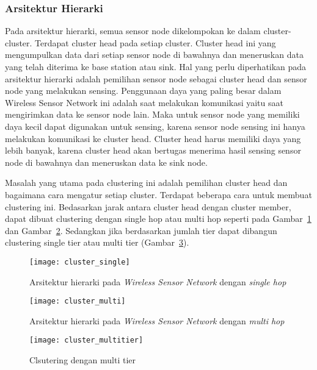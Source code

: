 \subsubsection{Arsitektur Hierarki}
Pada arsitektur hierarki, semua sensor node dikelompokan ke dalam cluster-cluster. Terdapat cluster head pada setiap cluster. Cluster head ini yang mengumpulkan data dari setiap sensor node di bawahnya dan meneruskan data yang telah diterima ke base station atau sink. Hal yang perlu diperhatikan pada arsitektur hierarki adalah pemilihan sensor node sebagai cluster head dan sensor node yang melakukan sensing. Penggunaan daya yang paling besar dalam Wireless Sensor Network ini adalah saat melakukan komunikasi yaitu saat mengirimkan data ke sensor node lain. Maka untuk sensor node yang memiliki daya kecil dapat digunakan untuk sensing, karena sensor node sensing ini hanya melakukan komunikasi ke cluster head. Cluster head harus memiliki daya yang lebih banyak, karena cluster head akan bertugas menerima hasil sensing sensor node di bawahnya dan meneruskan data ke sink node. 

Masalah yang utama pada clustering ini adalah pemilihan cluster head dan bagaimana cara mengatur setiap cluster. Terdapat beberapa cara untuk membuat clustering ini. Bedasarkan jarak antara cluster head dengan cluster member, dapat dibuat clustering dengan single hop atau multi hop seperti pada Gambar~\ref{fig:cluster_single} dan Gambar~\ref{fig:cluster_multi}. Sedangkan jika berdasarkan jumlah tier dapat dibangun clustering single tier atau multi tier (Gambar~\ref{fig:cluster_multitier}).
\begin{figure} [H]
	\centering  
	\texttt{[image: cluster\_single]}  
	\caption[Arsitektur hierarki pada \textit{Wireless Sensor Network} dengan \textit{single hop}]{Arsitektur hierarki pada \textit{Wireless Sensor Network} dengan \textit{single hop}} 
	\label{fig:cluster_single} 
\end{figure} 
\begin{figure} [H]
	\centering  
	\texttt{[image: cluster\_multi]}  
	\caption[Arsitektur hierarki pada \textit{Wireless Sensor Network} dengan \textit{multi hop}]{Arsitektur hierarki pada \textit{Wireless Sensor Network} dengan \textit{multi hop}} 
	\label{fig:cluster_multi} 
\end{figure} 
\begin{figure} [H]
	\centering  
	\texttt{[image: cluster\_multitier]}  
	\caption[Clsutering dengan multi tier]{Clsutering dengan multi tier} 
	\label{fig:cluster_multitier} 
\end{figure}

